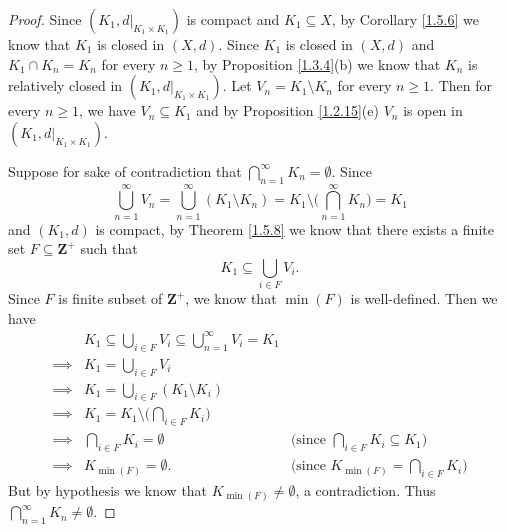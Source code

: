 \begin{proof}
    Since \((K_1, d|_{K_1 \times K_1})\) is compact and \(K_1 \subseteq X\), by Corollary \ref{1.5.6} we know that \(K_1\) is closed in \((X, d)\).
    Since \(K_1\) is closed in \((X, d)\) and \(K_1 \cap K_n = K_n\) for every \(n \geq 1\), by Proposition \ref{1.3.4}(b) we know that \(K_n\) is relatively closed in \((K_1, d|_{K_1 \times K_1})\).
    Let \(V_n = K_1 \setminus K_n\) for every \(n \geq 1\).
    Then for every \(n \geq 1\), we have \(V_n \subseteq K_1\) and by Proposition \ref{1.2.15}(e) \(V_n\) is open in \((K_1, d|_{K_1 \times K_1})\).

    Suppose for sake of contradiction that \(\bigcap_{n = 1}^\infty K_n = \emptyset\).
    Since
    \[
        \bigcup_{n = 1}^\infty V_n = \bigcup_{n = 1}^\infty (K_1 \setminus K_n) = K_1 \setminus \bigg(\bigcap_{n = 1}^\infty K_n\bigg) = K_1
    \]
    and \((K_1, d)\) is compact, by Theorem \ref{1.5.8} we know that there exists a finite set \(F \subseteq \mathbf{Z}^+\) such that
    \[
        K_1 \subseteq \bigcup_{i \in F} V_i.
    \]
    Since \(F\) is finite subset of \(\mathbf{Z}^+\), we know that \(\min(F)\) is well-defined.
    Then we have
    \begin{align*}
                 & K_1 \subseteq \bigcup_{i \in F} V_i \subseteq \bigcup_{n = 1}^\infty V_i = K_1                                                          \\
        \implies & K_1 = \bigcup_{i \in F} V_i                                                                                                             \\
        \implies & K_1 = \bigcup_{i \in F} (K_1 \setminus K_i)                                                                                             \\
        \implies & K_1 = K_1 \setminus \bigg(\bigcap_{i \in F} K_i\bigg)                                                                                   \\
        \implies & \bigcap_{i \in F} K_i = \emptyset                                              & \text{(since \(\bigcap_{i \in F} K_i \subseteq K_1)\)} \\
        \implies & K_{\min(F)} = \emptyset.                                                       & \text{(since \(K_{\min(F)} = \bigcap_{i \in F} K_i)\)}
    \end{align*}
    But by hypothesis we know that \(K_{\min(F)} \neq \emptyset\), a contradiction.
    Thus \(\bigcap_{n = 1}^\infty K_n \neq \emptyset\).
\end{proof}

